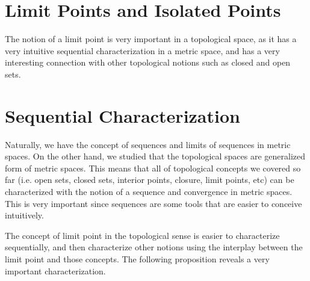 \section{Limit Points and Isolated Points}
The notion of a limit point is very important in a topological space, as it has a very intuitive sequential characterization in a metric space, and has a very interesting connection with other topological notions such as closed and open sets.


\section{Sequential Characterization}
Naturally, we have the concept of sequences and limits of sequences in metric spaces. On the other hand, we studied that the topological spaces are generalized form of metric spaces. This means that all of topological concepts we covered so far (i.e. open sets, closed sets, interior points, closure, limit points, etc) can be characterized with the notion of a sequence and convergence in metric spaces. This is very important since sequences are some tools that are easier to conceive intuitively. 

The concept of limit point in the topological sense is easier to characterize sequentially, and then characterize other notions using the interplay between the limit point and those concepts. The following proposition reveals a very important characterization.


